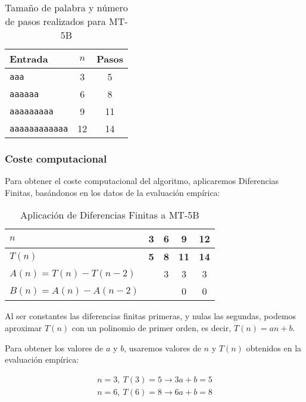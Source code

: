 \begin{table}[h]
    \centering
    \begin{tabular}{lcc}
        Entrada & $n$ & Pasos \\
        \hline
        \texttt{aaa}                &  3  & 5 \\
        \texttt{aaaaaa}             &  6  & 8 \\
        \texttt{aaaaaaaaa}          &  9  & 11 \\
        \texttt{aaaaaaaaaaaa}       & 12  & 14 \\
    \end{tabular}
    \caption{Tamaño de palabra y número de pasos realizados para MT-5B}
\end{table}


\subsubsection*{Coste computacional}
Para obtener el coste computacional del algoritmo, aplicaremos Diferencias Finitas, basándonos en los datos de la evaluación empírica:

\begin{table}[H]
    \centering
    \begin{tabular}{|l|c|c|c|c|}
        \hline
        $n$    & \textbf{3} & \textbf{6} & \textbf{9}  & \textbf{12} \\ \hline
        $T(n)$ & \textbf{5} & \textbf{8} & \textbf{11} & \textbf{14} \\ \hline
        \hline
        $A(n) = T(n) - T(n-2)$ &   & 3 & 3 & 3 \\ \hline
        $B(n) = A(n) - A(n-2)$ &   &   & 0 & 0 \\ \hline
    \end{tabular}
    \caption{Aplicación de Diferencias Finitas a MT-5B}
\end{table}

Al ser constantes las diferencias finitas primeras, y nulas las segundas, podemos aproximar $T(n)$ con un polinomio de primer orden, es decir, $T(n) = an + b$.\medskip

Para obtener los valores de $a$ y $b$, usaremos valores de $n$ y $T(n)$ obtenidos en la evaluación empírica:

\begin{subequations}
    \begin{gather*}
        n = 3,\ T(3) = 5 \rightarrow 3a + b = 5 \\
        n = 6,\ T(6) = 8 \rightarrow 6a + b = 8
    \end{gather*}
\end{subequations}

